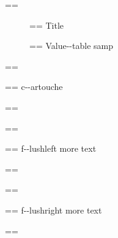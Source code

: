\documentclass{book}
\makeatletter
\newcommand\Texinfotablestylesamp[1]{\ifstrempty{#1}{}{`\texttt{#1}'}}%
\newenvironment{Texinfopreformatted}{%
  \par\GNUTobeylines\obeyspaces\frenchspacing\parskip=\z@\parindent=\z@}{}
{\catcode`\^^M=13 \gdef\GNUTobeylines{\catcode`\^^M=13 \def^^M{\null\par}}}
\newenvironment{Texinfoindented}{\begin{list}{}{}\item\relax}{\end{list}}
\renewcommand{\_}{\Texinfounderscore\discretionary{}{}{}}
\makeatother
\begin{document}
\begin{Texinfoindented}
\begin{description}
\end{description}
\begin{Texinfopreformatted}%
\ttfamily 
\end{Texinfopreformatted}
\begin{description}
\item[] \begin{Texinfopreformatted}%
\ttfamily Title
\end{Texinfopreformatted}
\item[{\parbox[b]{\linewidth}{%
\Texinfotablestylesamp{a{-}{-}samp}\\
\Texinfotablestylesamp{a2{-}{-}samp}}}]
\begin{Texinfopreformatted}%
\ttfamily Value{-}{-}table samp
\end{Texinfopreformatted}
\end{description}
\begin{Texinfopreformatted}%
\ttfamily 
\end{Texinfopreformatted}
\begin{mdframed}[style=Texinfocartouche]
\begin{Texinfopreformatted}%
\ttfamily c{-}{-}artouche
\end{Texinfopreformatted}
\end{mdframed}
\begin{Texinfopreformatted}%
\ttfamily 
\end{Texinfopreformatted}
\begin{flushleft}
\begin{Texinfopreformatted}%
\begin{Texinfopreformatted}%
\ttfamily f{-}{-}lushleft
more text
\end{Texinfopreformatted}
\end{Texinfopreformatted}
\end{flushleft}
\begin{Texinfopreformatted}%
\ttfamily 
\end{Texinfopreformatted}
\begin{flushright}
\begin{Texinfopreformatted}%
\begin{Texinfopreformatted}%
\ttfamily f{-}{-}lushright
more text
\end{Texinfopreformatted}
\end{Texinfopreformatted}
\end{flushright}
\begin{Texinfopreformatted}%
\ttfamily 
\end{Texinfopreformatted}

\end{Texinfoindented}
\end{document}
